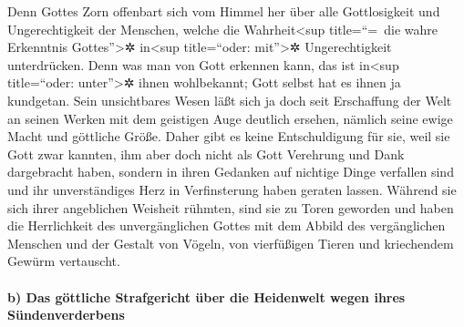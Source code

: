  Denn Gottes Zorn offenbart sich vom Himmel her über alle
Gottlosigkeit und Ungerechtigkeit der Menschen, welche die
Wahrheit\textless sup title=``=~die wahre Erkenntnis
Gottes''\textgreater✲ in\textless sup title=``oder: mit''\textgreater✲
Ungerechtigkeit unterdrücken.  Denn was man von Gott
erkennen kann, das ist in\textless sup title=``oder:
unter''\textgreater✲ ihnen wohlbekannt; Gott selbst hat es ihnen ja
kundgetan.  Sein unsichtbares Wesen läßt sich ja doch
seit Erschaffung der Welt an seinen Werken mit dem geistigen Auge
deutlich ersehen, nämlich seine ewige Macht und göttliche Größe. Daher
gibt es keine Entschuldigung für sie,  weil sie Gott zwar
kannten, ihm aber doch nicht als Gott Verehrung und Dank dargebracht
haben, sondern in ihren Gedanken auf nichtige Dinge verfallen sind und
ihr unverständiges Herz in Verfinsterung haben geraten lassen.
 Während sie sich ihrer angeblichen Weisheit rühmten,
sind sie zu Toren geworden  und haben die Herrlichkeit
des unvergänglichen Gottes mit dem Abbild des vergänglichen Menschen und
der Gestalt von Vögeln, von vierfüßigen Tieren und kriechendem Gewürm
vertauscht.

\hypertarget{b-das-guxf6ttliche-strafgericht-uxfcber-die-heidenwelt-wegen-ihres-suxfcndenverderbens}{%
\paragraph{b) Das göttliche Strafgericht über die Heidenwelt wegen ihres
Sündenverderbens}\label{b-das-guxf6ttliche-strafgericht-uxfcber-die-heidenwelt-wegen-ihres-suxfcndenverderbens}}

